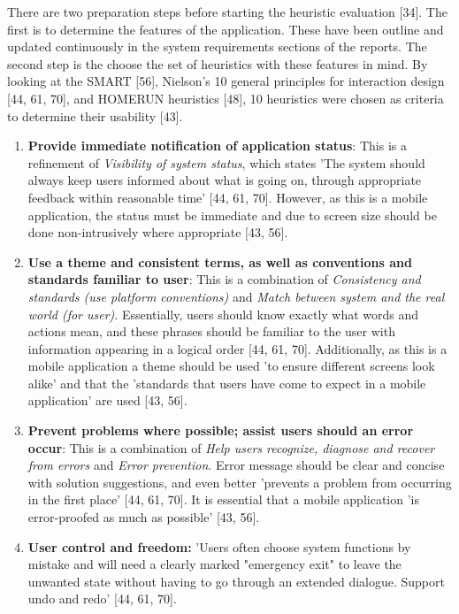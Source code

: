 \documentclass[a4 paper, 12pt]{article}
\begin{document}
    There are two preparation steps before starting the heuristic evaluation [34]. The first is to determine the features of the application. These have been outline and updated continuously in the system requirements sections of the reports. The second step is the choose the set of heuristics with these features in mind. By looking at the \textcolor{mygreen}{SMART} [56], \textcolor{myblue}{Nielson's 10 general principles for interaction design} [44, 61, 70], and \textcolor{myorange}{HOMERUN} heuristics [48], 10 heuristics were chosen as criteria to determine their usability [43].
        \begin{enumerate}
            \item \textbf{\textcolor{mygreen}{Provide immediate notification of application status}}: 
            This is a refinement of \textit{\textcolor{myblue}{Visibility of system status}}, which states 'The system should always keep users informed about what is going on, through appropriate feedback within reasonable time' [44, 61, 70]. However, as this is a mobile application, the status must be immediate and due to screen size should be done non-intrusively where appropriate [43, 56].
            \item \textbf{\textcolor{mygreen}{Use a theme and consistent terms, as well as conventions and standards familiar to user}}: This is a combination of \textit{\textcolor{myblue}{Consistency and standards (use platform conventions)}} and \textit{\textcolor{myblue}{Match between system and the real world (for user)}}. Essentially, users should know exactly what words and actions mean, and these phrases should be familiar to the user with information appearing in a logical order [44, 61, 70]. Additionally, as this is a mobile application a theme should be used 'to ensure different screens look alike' and that the 'standards that users have come to expect in a mobile application' are used [43, 56].         
            \item \textbf{\textcolor{mygreen}{Prevent problems where possible; assist users should an error occur}}: This is a combination of \textit{\textcolor{myblue}{Help users recognize, diagnose and recover from errors}} and \textit{\textcolor{myblue}{Error prevention}}. Error message should be clear and concise with solution suggestions, and even better 'prevents a problem from occurring in the first place' [44, 61, 70]. It is essential that a mobile application 'is error-proofed as much as possible' [43, 56].        
            \item \textbf{\textcolor{myblue}{User control and freedom:}} 'Users often choose system functions by mistake and will need a clearly marked "emergency exit" to leave the unwanted state without having to go through an extended dialogue. Support undo and redo' [44, 61, 70].  

\end{enumerate}
\end{document}
